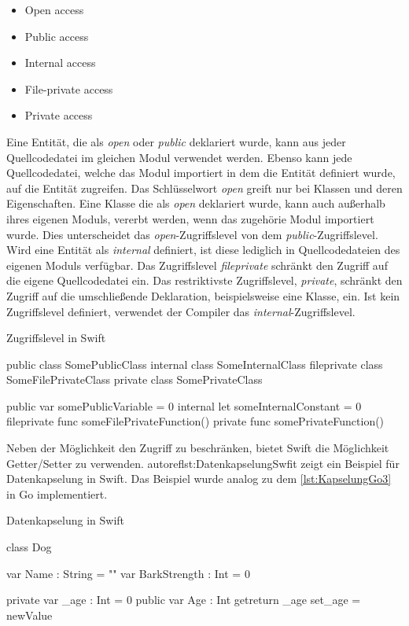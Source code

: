 \begin{itemize}
    \item Open access
    \item Public access
    \item Internal access
    \item File-private access
    \item Private access
\end{itemize}

Eine Entität, die als \textit{open} oder \textit{public} deklariert wurde, kann aus jeder Quellcodedatei im gleichen Modul verwendet werden. 
Ebenso kann jede Quellcodedatei, welche das Modul importiert in dem die Entität definiert wurde, auf die Entität zugreifen. 
Das Schlüsselwort \textit{open} greift nur bei Klassen und deren Eigenschaften.
Eine Klasse die als \textit{open} deklariert wurde, kann auch außerhalb ihres eigenen Moduls, vererbt werden, wenn das zugehörie Modul importiert wurde.
Dies unterscheidet das \textit{open}-Zugriffslevel von dem \textit{public}-Zugriffslevel.
Wird eine Entität als \textit{internal} definiert, ist diese lediglich in Quellcodedateien des eigenen Moduls verfügbar. 
Das Zugriffslevel \textit{fileprivate} schränkt den Zugriff auf die eigene Quellcodedatei ein.
Das restriktivste Zugriffslevel, \textit{private}, schränkt den Zugriff auf die umschließende Deklaration, beispielsweise eine Klasse, ein.
Ist kein Zugriffslevel definiert, verwendet der Compiler das \textit{internal}-Zugriffslevel.

\begin{listing}
\caption{Zugriffslevel in Swift \cite[S.396]{Apple.2017}}
\label{lst:ZugriffslevelSwift}
\begin{SwiftCode}
public class SomePublicClass {}
internal class SomeInternalClass {}
fileprivate class SomeFilePrivateClass {}
private class SomePrivateClass {}

public var somePublicVariable = 0
internal let someInternalConstant = 0
fileprivate func someFilePrivateFunction() {}
private func somePrivateFunction() {}
\end{SwiftCode}
\end{listing}

Neben der Möglichkeit den Zugriff zu beschränken, bietet Swift die Möglichkeit Getter/Setter zu verwenden.
autoref{lst:DatenkapselungSwfit} zeigt ein Beispiel für Datenkapselung in Swift. 
Das Beispiel wurde analog zu dem \autoref{lst:KapselungGo3} in Go implementiert.

\begin{listing}
\caption{Datenkapselung in Swift}
\label{lst:DatenkapselungSwfit}
\begin{SwiftCode}
class Dog {
    var Name : String = ""
    var BarkStrength : Int = 0
	
    private var _age : Int = 0
    public var Age : Int {
        get{return _age}
        set{_age = newValue}
    }
}
\end{SwiftCode}
\end{listing}

